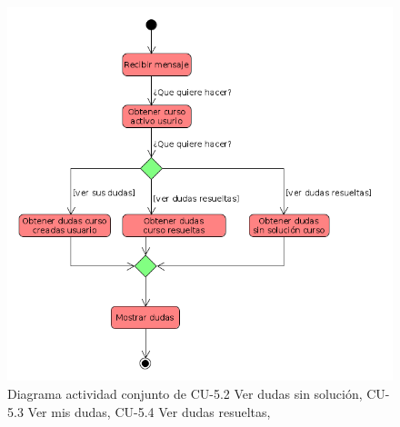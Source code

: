         \begin{figure}[H] %
\centering
\includegraphics[scale=0.3]{imagenes/diagramas/actividad/ver_dudas_sin_con_mis.png}  %

\caption{Diagrama actividad conjunto de CU-5.2 Ver dudas sin solución, CU-5.3 Ver mis dudas, CU-5.4 Ver dudas resueltas,}\label{figura1423}
\end{figure}


